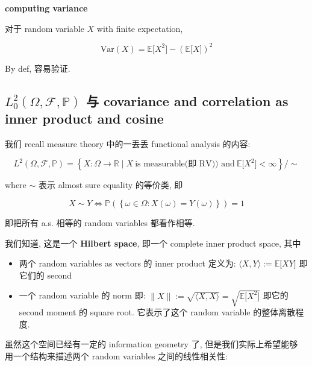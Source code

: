 \documentclass{qlnotes-export}
\begin{document}
\begin{proposition}{\protect{}\label{kn-computing-variance}{\textbf{computing
variance}}}

对于 random variable \(X\) with finite expectation,

\[\text{Var}(X) = {\mathbb{E}}\lbrack X^{2}\rbrack - ({\mathbb{E}}\lbrack X\rbrack)^{2}\]

\end{proposition}

By def, 容易验证.

\subsection{\texorpdfstring{\(L_{0}^{2}(\Omega,\mathcal{F},{\mathbb{P}})\) 与 covariance and correlation as inner product and cosine}{L\_\{0\}\^{}\{2\}(\textbackslash Omega,\textbackslash mathcal\{F\},\{\textbackslash mathbb\{P\}\}) 与 covariance and correlation as inner product and cosine}}\label{l_02omegamathcalfmathbbp-ux4e0e-covariance-and-correlation-as-inner-product-and-cosine}

我们 recall measure theory 中的一丢丢 functional analysis 的内容:

\[L^{2}(\Omega,\mathcal{F},{\mathbb{P}}) = \left\{ {X:\Omega\rightarrow{\mathbb{R}} \mid X\ \text{is measurable(即 RV)) and}\ {\mathbb{E}}\lbrack X^{2}\rbrack < \infty} \right\}/ \sim\]

where \(\sim\) 表示 almost sure equality 的等价类, 即

\[X \sim Y\Leftrightarrow{\mathbb{P}}(\left\{ {\omega \in \Omega:X(\omega) = Y(\omega)} \right\}) = 1\]

即把所有 a.s. 相等的 random variables 都看作相等.

我们知道, 这是一个 \textbf{Hilbert space}, 即一个 complete inner product space, 其中

\begin{itemize}
\item
  两个 random variables as vectors 的 inner product 定义为: \(\langle X,Y\rangle := {\mathbb{E}}\lbrack XY\rbrack\) 即它们的 second
\item
  一个 random variable 的 norm 即: \(\parallel X \parallel := \sqrt{\langle X,X\rangle} = \sqrt{{\mathbb{E}}\lbrack X^{2}\rbrack}\) 即它的 second moment 的 square root. 它表示了这个 random variable 的整体离散程度.
\end{itemize}

虽然这个空间已经有一定的 information geometry 了, 但是我们实际上希望能够 用一个结构来描述两个 random variables 之间的线性相关性:
\end{document}
